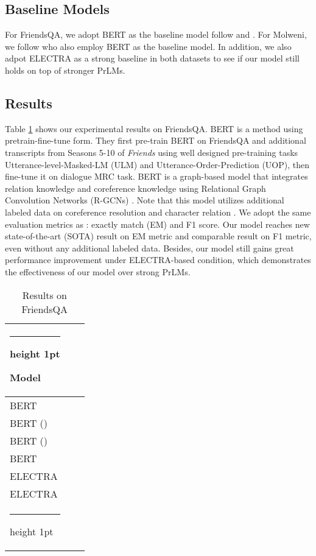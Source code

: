 \documentclass[11pt]{article}
\makeatletter
\newcommand{\thickhline}{\noalign {\ifnum 0=`}\fi \hrule height 1pt
	\futurelet \reserved@a \@xhline
}
\makeatother
\begin{document}
	\let\thefootnote\relax{}
	
	\subsection{Baseline Models}
	For FriendsQA, we adopt BERT as the baseline model follow \citet{li2020transformers} and \citet{liu2020graph}. For Molweni, we follow \citet{li2021dadgraph} who also employ BERT as the baseline model. In addition, we also adpot ELECTRA \citep{clark2020electra} as a strong baseline in both datasets to see if our model still holds on top of stronger PrLMs.
	
	\subsection{Results}
	Table \ref{FriendsResult} shows our experimental results on FriendsQA. BERT \citep{li2020transformers} is a method using pretrain-fine-tune form. They first pre-train BERT on FriendsQA and additional transcripts from Seasons 5-10 of \emph{Friends} using well designed pre-training tasks Utterance-level-Masked-LM (ULM) and Utterance-Order-Prediction (UOP), then fine-tune it on dialogue MRC task. BERT \citep{liu2020graph} is a graph-based model that integrates relation knowledge and coreference knowledge using Relational Graph Convolution Networks (R-GCNs) \citep{schlichtkrull2018modeling}. Note that this model utilizes additional labeled data on coreference resolution \citep{chen2017robust} and character relation \citep{yu2020dialogue}. We adopt the same evaluation metrics as \citet{li2020molweni}: exactly match (EM) and F1 score. Our model reaches new state-of-the-art (SOTA) result on EM metric and comparable result on F1 metric, even without any additional labeled data. Besides, our model still gains great performance improvement under ELECTRA-based condition, which demonstrates the effectiveness of our model over strong PrLMs.
	\begin{table}[htbp]
		\centering
		\begin{tabular}{l c c}
			\thickhline
			Model &  & \\
			\hline \hline
			BERT &  & \\
			BERT (\citeauthor{li2020transformers}) &  & \\
			BERT (\citeauthor{liu2020graph}) &  & \\
			BERT &  & \\
			\hline
			ELECTRA &  & \\
			ELECTRA &  & \\
			\thickhline
		\end{tabular}
		\caption{Results on FriendsQA}
		\label{FriendsResult}
	\end{table}
	
\end{document}
